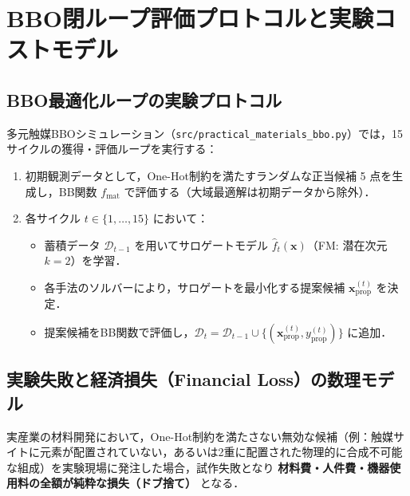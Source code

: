 \documentclass[11pt,a4paper]{ltjsarticle}
\begin{document}
\section{BBO閉ループ評価プロトコルと実験コストモデル}
\label{sec:bbo_protocol}

\subsection{BBO最適化ループの実験プロトコル}
多元触媒BBOシミュレーション（\texttt{src/practical\_materials\_bbo.py}）では，15サイクルの獲得・評価ループを実行する：
\begin{enumerate}\setlength{\itemsep}{2pt}
    \item 初期観測データとして，One-Hot制約を満たすランダムな正当候補 5 点を生成し，BB関数 $f_{\mathrm{mat}}$ で評価する（大域最適解は初期データから除外）．
    \item 各サイクル $t \in \{1, \dots, 15\}$ において：
    \begin{itemize}
        \item 蓄積データ $\mathcal{D}_{t-1}$ を用いてサロゲートモデル $\hat{f}_t(\bm{x})$（FM: 潜在次元 $k=2$）を学習．
        \item 各手法のソルバーにより，サロゲートを最小化する提案候補 $\bm{x}_{\mathrm{prop}}^{(t)}$ を決定．
        \item 提案候補をBB関数で評価し，$\mathcal{D}_t = \mathcal{D}_{t-1} \cup \{(\bm{x}_{\mathrm{prop}}^{(t)}, y_{\mathrm{prop}}^{(t)})\}$ に追加．
    \end{itemize}
\end{enumerate}

\subsection{実験失敗と経済損失（Financial Loss）の数理モデル}
実産業の材料開発において，One-Hot制約を満たさない無効な候補（例：触媒サイトに元素が配置されていない，あるいは2重に配置された物理的に合成不可能な組成）を実験現場に発注した場合，試作失敗となり \textbf{材料費・人件費・機器使用料の全額が純粋な損失（ドブ捨て）} となる．
\end{document}
